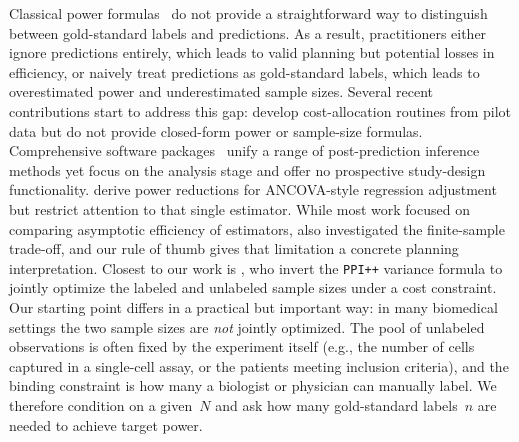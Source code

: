 \documentclass[12pt]{article}
\begin{document}
Classical power formulas~\citep{erdfelder1996gpower,faul2007gpower} do not provide a straightforward way to distinguish between gold-standard labels and predictions. As a result, practitioners either ignore predictions entirely, which leads to valid planning but potential losses in efficiency, or naively treat predictions as gold-standard labels, which leads to overestimated power and underestimated sample sizes. Several recent contributions start to address this gap: \citet{angelopoulos2023ppipp} develop cost-allocation routines from pilot data but do not provide closed-form power or sample-size formulas.  Comprehensive software packages~\citep{salerno2025ipd,egami2024using} unify a range of post-prediction inference methods yet focus on the analysis stage
and offer no prospective study-design functionality. \citet{poulet2025prediction} derive power reductions for
ANCOVA-style regression adjustment but restrict attention to that single estimator. While most work focused on comparing asymptotic efficiency of estimators, \citet{mani2025no} also investigated the finite-sample trade-off, and our rule of thumb gives that limitation a concrete planning interpretation. Closest to our work is \citet{broska2025mixed}, who invert the \texttt{PPI++} variance formula to jointly optimize the labeled and unlabeled sample sizes under a cost constraint.  Our starting point differs in a practical but important way: in many biomedical settings the two sample sizes are \emph{not} jointly optimized.  The pool of unlabeled observations is often fixed by the experiment itself (e.g., the number of cells captured in a single-cell assay, or the patients meeting inclusion criteria), and the binding constraint is how many a biologist or physician can manually label.  We therefore condition on a given~$N$ and ask how many gold-standard labels~$n$ are needed to achieve target power.
\end{document}
